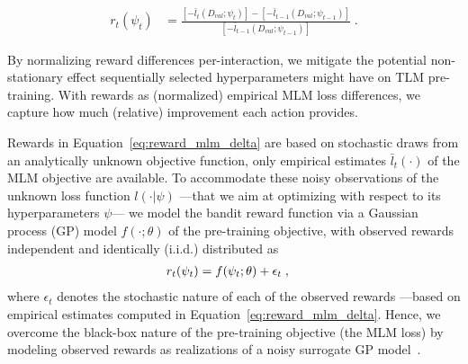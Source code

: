 \begin{align}
r_t (\psi_t) &= \frac{
	[- \bar{l}_t(D_{val}; \psi_t)] 
		- [- \bar{l}_{t-1}(D_{val}; \psi_{t-1})]
	}{
		[- \bar{l}_{t-1}(D_{val}; \psi_{t-1})]
	} \;.
\label{eq:reward_mlm_delta}
\end{align}

By normalizing reward differences per-interaction,
we mitigate the potential non-stationary effect sequentially selected hyperparameters might have on TLM pre-training.
With rewards as (normalized) empirical MLM loss differences,
we capture how much (relative) improvement each action provides.

Rewards in Equation~\eqref{eq:reward_mlm_delta}
are based on stochastic draws from an analytically unknown objective function,
\ie only empirical estimates $\bar{l}_t(\cdot)$ of the MLM objective are available.
%
To accommodate these noisy observations of the unknown loss function $l(\cdot|\psi)$
---that we aim at optimizing with respect to its hyperparameters $\psi$---
we model the bandit reward function via a Gaussian process (GP) model $f(\cdot ;\theta)$ of the pre-training objective,
with observed rewards independent and identically (i.i.d.) distributed as
\vspace*{-1ex}
\begin{align}
r_t(\psi_t) &=f(\psi_t ; \theta) + \epsilon_t \;,
\label{eq:rewards_gp}
\vspace*{-2ex}
\end{align} 
where $\epsilon_t$ denotes the stochastic nature of each of the observed rewards ---based on empirical estimates computed in Equation~\eqref{eq:reward_mlm_delta}.
Hence, we overcome the black-box nature of the pre-training objective (\eg the MLM loss) by modeling observed rewards as realizations of a noisy surrogate GP model~\citep{b-Rasmussen2005}.

